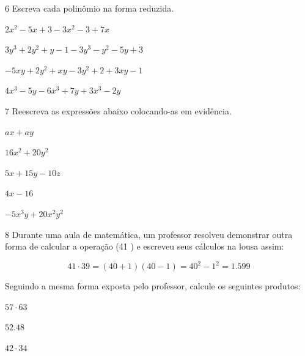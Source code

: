 \pagebreak

\num{6} Escreva cada polinômio na forma reduzida.

\begin{escolha}[itemsep=0pt]
\item $2x^2 - 5x + 3 - 3x^2 - 3 + 7x$
\item $3y^3 + 2y^2 + y - 1 - 3y^3 - y^2 - 5y +3$
\item $-5xy + 2y^2 + xy - 3y^2 + 2 + 3xy - 1$
\item $4x^3 - 5y - 6x^3 + 7y + 3x^3 - 2y$
\end{escolha}


\num{7} Reescreva as expressões abaixo colocando-as em evidência.

\begin{escolha}[itemsep=0pt]
\item $ax + ay$
\item $16x^2 + 20y^2$
\item $5x + 15y - 10z$
\item $4x - 16$
\item $-5x^3y + 20x^2y^2$
\end{escolha}

\num{8} Durante uma aula de matemática, um professor resolveu demonstrar
outra forma de calcular a operação (41 ) e escreveu seus cálculos na
lousa assim:

$$41 \cdot 39 = (40 + 1) (40 - 1) = 40^2 - 1^2 = 1.599$$

Seguindo a mesma forma exposta pelo professor, calcule os seguintes
produtos:

\begin{escolha}[itemsep=0pt]
\item $57 \cdot 63$
\item $52. 48$
\item $42 \cdot 34$
\end{escolha}

\pagebreak


